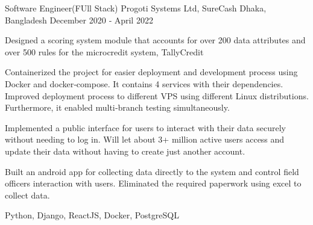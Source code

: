 \cventry
    {Software Engineer(FUll Stack)}
    {Progoti Systems Ltd, SureCash}
    {Dhaka, Bangladesh}
    {December 2020 ‐ April 2022}
    {
      \begin{cvitems}
        \item {Designed a scoring system module that accounts for over 200 data attributes and over 500 rules for the microcredit system, TallyCredit}
        \item {Containerized the project for easier deployment and development process using Docker and docker‑compose. It contains 4 services with their dependencies. Improved deployment process to different VPS using different Linux distributions. Furthermore, it enabled multi‑branch testing simultaneously.}
        \item {Implemented a public interface for users to interact with their data securely without needing to log in. Will let about 3+ million active users access and update their data without having to create just another account.}
        \item {Built an android app for collecting data directly to the system and control field officers interaction with users. Eliminated the required paperwork using excel to collect data.}
      \end{cvitems}
    }
    {Python, Django, ReactJS, Docker, PostgreSQL}
